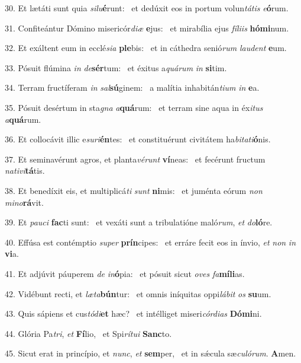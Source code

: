 30. Et lætáti sunt quia \textit{si}\textit{lu}\textbf{é}runt: \ast\  et dedúxit eos in portum volun\textit{tá}\textit{tis} \textit{e}\textbf{ó}rum.\

31. Confiteántur Dómino misericór\textit{di}\textit{æ} \textbf{e}jus: \ast\  et mirabília ejus \textit{fí}\textit{li}\textit{is} \textbf{hó}\textbf{mi}num.\

32. Et exáltent eum in ecclé\textit{si}\textit{a} \textbf{ple}bis: \ast\  et in cáthedra senió\textit{rum} \textit{lau}\textit{dent} \textbf{e}um.\

33. Pósuit flúmina \textit{in} \textit{de}\textbf{sér}tum: \ast\  et éxitus a\textit{quá}\textit{rum} \textit{in} \textbf{si}tim.\

34. Terram fructíferam \textit{in} \textit{sal}\textbf{sú}ginem: \ast\  a malítia inhabitán\textit{ti}\textit{um} \textit{in} \textbf{e}a.\

35. Pósuit desértum in sta\textit{gna} \textit{a}\textbf{quá}rum: \ast\  et terram sine aqua in éx\textit{i}\textit{tus} \textit{a}\textbf{quá}rum.\

36. Et collocávit illic e\textit{su}\textit{ri}\textbf{én}tes: \ast\  et constituérunt civitátem ha\textit{bi}\textit{ta}\textit{ti}\textbf{ó}nis.\

37. Et seminavérunt agros, et planta\textit{vé}\textit{runt} \textbf{ví}neas: \ast\  et fecérunt fructum \textit{na}\textit{ti}\textit{vi}\textbf{tá}tis.\

38. Et benedíxit eis, et multiplicá\textit{ti} \textit{sunt} \textbf{ni}mis: \ast\  et juménta eórum \textit{non} \textit{mi}\textit{no}\textbf{rá}vit.\

39. Et \textit{pau}\textit{ci} \textbf{fac}ti sunt: \ast\  et vexáti sunt a tribulatióne maló\textit{rum}, \textit{et} \textit{do}\textbf{ló}re.\

40. Effúsa est contémptio \textit{su}\textit{per} \textbf{prín}cipes: \ast\  et erráre fecit eos in ínvio, \textit{et} \textit{non} \textit{in} \textbf{vi}a.\

41. Et adjúvit páuperem \textit{de} \textit{in}\textbf{ó}pia: \ast\  et pósuit sicut \textit{o}\textit{ves} \textit{fa}\textbf{mí}\textbf{li}as.\

42. Vidébunt recti, et \textit{læ}\textit{ta}\textbf{bún}tur: \ast\  et omnis iníquitas oppi\textit{lá}\textit{bit} \textit{os} \textbf{su}um.\

43. Quis sápiens et cus\textit{tó}\textit{di}\textbf{et} hæc? \ast\  et intélliget miseri\textit{cór}\textit{di}\textit{as} \textbf{Dó}\textbf{mi}ni.\

44. Glória Pa\textit{tri}, \textit{et} \textbf{Fí}lio, \ast\  et Spi\textit{rí}\textit{tu}\textit{i} \textbf{Sanc}to.\

45. Sicut erat in princípio, et \textit{nunc}, \textit{et} \textbf{sem}per, \ast\  et in sǽcula sæ\textit{cu}\textit{ló}\textit{rum}. \textbf{A}men.\

